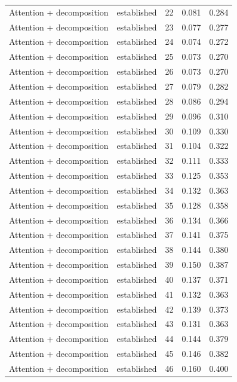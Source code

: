 \begin{tabular}{llrrr}
Attention + decomposition & established & 22 & 0.081 & 0.284 \\
Attention + decomposition & established & 23 & 0.077 & 0.277 \\
Attention + decomposition & established & 24 & 0.074 & 0.272 \\
Attention + decomposition & established & 25 & 0.073 & 0.270 \\
Attention + decomposition & established & 26 & 0.073 & 0.270 \\
Attention + decomposition & established & 27 & 0.079 & 0.282 \\
Attention + decomposition & established & 28 & 0.086 & 0.294 \\
Attention + decomposition & established & 29 & 0.096 & 0.310 \\
Attention + decomposition & established & 30 & 0.109 & 0.330 \\
Attention + decomposition & established & 31 & 0.104 & 0.322 \\
Attention + decomposition & established & 32 & 0.111 & 0.333 \\
Attention + decomposition & established & 33 & 0.125 & 0.353 \\
Attention + decomposition & established & 34 & 0.132 & 0.363 \\
Attention + decomposition & established & 35 & 0.128 & 0.358 \\
Attention + decomposition & established & 36 & 0.134 & 0.366 \\
Attention + decomposition & established & 37 & 0.141 & 0.375 \\
Attention + decomposition & established & 38 & 0.144 & 0.380 \\
Attention + decomposition & established & 39 & 0.150 & 0.387 \\
Attention + decomposition & established & 40 & 0.137 & 0.371 \\
Attention + decomposition & established & 41 & 0.132 & 0.363 \\
Attention + decomposition & established & 42 & 0.139 & 0.373 \\
Attention + decomposition & established & 43 & 0.131 & 0.363 \\
Attention + decomposition & established & 44 & 0.144 & 0.379 \\
Attention + decomposition & established & 45 & 0.146 & 0.382 \\
Attention + decomposition & established & 46 & 0.160 & 0.400 \\

\end{tabular}
